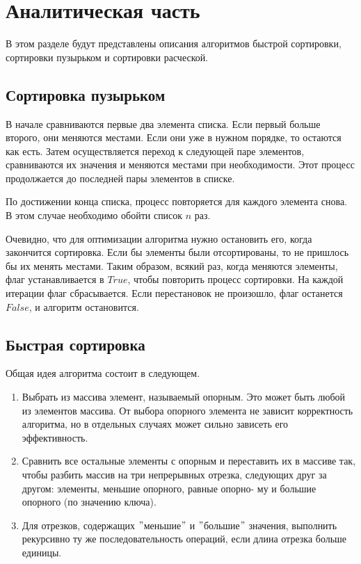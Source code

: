 \chapter{Аналитическая часть}
В этом разделе будут представлены описания алгоритмов быстрой сортировки, сортировки %
пузырьком и сортировки %
расческой\cite{sort_algs}.

\section{Сортировка пузырьком}

В начале сравниваются первые два элемента списка. Если первый больше второго, они меняются местами. Если они уже в нужном порядке, то остаются как есть. Затем осуществляется переход к следующей паре элементов, сравниваются их значения и меняются местами при необходимости. Этот процесс продолжается до последней пары элементов в списке.

По достижении конца списка, процесс повторяется для каждого элемента снова. В этом случае необходимо обойти список $n$ раз.

Очевидно, что для оптимизации алгоритма нужно остановить его, когда закончится сортировка. Если бы элементы были отсортированы, то не пришлось бы их менять местами. Таким образом, всякий раз, когда меняются элементы, флаг устанавливается в $True$, чтобы повторить процесс сортировки. На каждой итерации флаг сбрасывается. Если перестановок не произошло, флаг останется $False$, и алгоритм остановится.


\section{Быстрая сортировка}

Общая идея алгоритма состоит в следующем.
\begin{enumerate}
	\item Выбрать из массива элемент, называемый опорным. Это может быть любой из элементов массива. От выбора опорного элемента не зависит корректность алгоритма, но в отдельных случаях может сильно зависеть его эффективность.
	\item Сравнить все остальные элементы с опорным и переставить их в массиве так, чтобы разбить массив на три непрерывных отрезка, следующих друг за другом: элементы, меньшие опорного, равные опорно-
	\newpage
	му и большие опорного (по значению ключа).
	\item Для отрезков, содержащих $"$меньшие$"$ и $"$большие$"$ значения, выполнить рекурсивно ту же последовательность операций, если длина отрезка больше единицы.
\end{enumerate}

